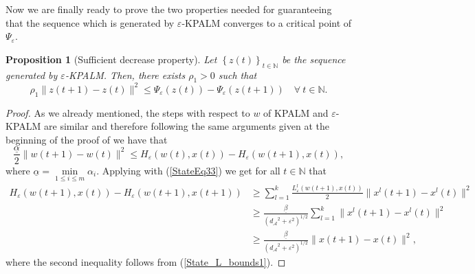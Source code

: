 \documentclass[11pt]{article}
\numberwithin{equation}{section}
\newtheorem{proposition}{Proposition}[section]
\begin{document}
Now we are finally ready to prove the two properties needed for guaranteeing that the sequence which is generated by $\varepsilon$-KPALM converges to a critical point of $\Psi_{\varepsilon}$.

\begin{proposition}[Sufficient decrease property]
Let $\left\lbrace z(t) \right\rbrace_{t \in \mathbb{N}}$ be the sequence generated by $\varepsilon$-KPALM. Then, there exists $\rho_1 > 0$ such that 
\begin{equation*}
	\rho_1 \|z(t+1) - z(t)\|^2 \leq \Psi_{\varepsilon}(z(t)) - \Psi_{\varepsilon}(z(t+1)) \quad \forall \: t \in \mathbb{N} .
\end{equation*}
\end{proposition}

\begin{proof}
As we already mentioned, the steps with respect to $w$ of KPALM and $\varepsilon$-KPALM  are similar and therefore following the same arguments given at the beginning of the proof of  we have that
\begin{equation}
	\frac{\underline{\alpha}}{2} \|w(t+1) - w(t)\|^2 \leq H_{\varepsilon}(w(t),x(t)) - H_{\varepsilon}(w(t+1),x(t)) , \label{StateEq37}
\end{equation}
where $\underline{\alpha} = \min\limits_{1 \leq i \leq m} \alpha_i $.
Applying  with (\ref{StateEq33}) we get for all $t \in \mathbb{N}$ that
\begin{align}
	H_{\varepsilon}(w(t+1),x(t)) - H_{\varepsilon}(w(t+1),x(t+1)) 
	&\geq \sum\limits_{l=1}^{k} \frac{L^l_{\varepsilon}(w(t+1),x(t))}{2} \|x^l(t+1)-x^l(t)\|^2 \\
	&\geq \frac{\underline{\beta}}{\left( {d_{\mathcal{A}}}^2 + {\varepsilon}^2 \right)^{1/2}} \sum\limits _{l=1}^{k} \|x^l(t+1)-x^l(t)\|^2 \\
	&\geq \frac{\underline{\beta}}{\left( {d_{\mathcal{A}}}^2 + {\varepsilon}^2 \right)^{1/2}} \|x(t+1)-x(t)\|^2 , \label{StateEq39}
\end{align}
where the second inequality follows from (\ref{State_L_bounds1}).

\end{proof}
\end{document}
